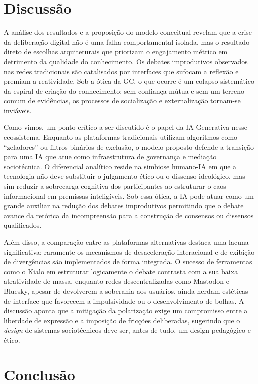 \documentclass[conference]{IEEEtran} \IEEEoverridecommandlockouts %
\begin{document}
\section{Discussão}

A análise dos resultados e a proposição do modelo conceitual revelam que a crise da deliberação digital não é uma falha comportamental isolada, mas o resultado direto de escolhas arquiteturais que priorizam o engajamento métrico em detrimento da qualidade do conhecimento. Os debates improdutivos observados nas redes tradicionais são catalisados por interfaces que sufocam a reflexão e premiam a reatividade. Sob a ótica da GC, o que ocorre é um colapso sistemático da espiral de criação do conhecimento: sem confiança mútua e sem um terreno comum de evidências, os processos de socialização e externalização tornam-se inviáveis.

Como vimos, um ponto crítico a ser discutido é o papel da IA Generativa nesse ecossistema. Enquanto as plataformas tradicionais utilizam algoritmos como ``zeladores'' ou filtros binários de exclusão, o modelo proposto defende a transição para uma IA que atue como infraestrutura de governança e mediação sociotécnica. O diferencial analítico reside na simbiose humano-IA em que a tecnologia não deve substituir o julgamento ético ou o dissenso ideológico, mas sim reduzir a sobrecarga cognitiva dos participantes ao estruturar o caos informacional em premissas inteligíveis. Sob essa ótica, a IA pode atuar como um grande auxiliar na redução dos debates improdutivos permitindo que o debate avance da retórica da incompreensão para a construção de consensos ou dissensos qualificados.

Além disso, a comparação entre as plataformas alternativas destaca uma lacuna significativa: raramente os mecanismos de desaceleração interacional e de exibição de divergências são implementados de forma integrada. O sucesso de ferramentas como o Kialo em estruturar logicamente o debate contrasta com a sua baixa atratividade de massa, enquanto redes descentralizadas como Mastodon e Bluesky, apesar de devolverem a soberania aos usuários, ainda herdam estéticas de interface que favorecem a impulsividade ou o desenvolvimento de bolhas. A discussão aponta que a mitigação da polarização exige um compromisso entre a liberdade de expressão e a imposição de fricções deliberadas, sugerindo que o \textit{design} de sistemas sociotécnicos deve ser, antes de tudo, um design pedagógico e ético.

\section{Conclusão}
\end{document}
